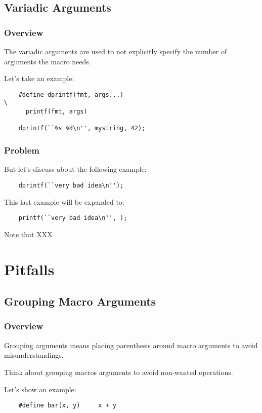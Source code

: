 \documentclass[9pt]{beamer}
\newcommand{\nl}[0]{\vspace{0.4cm}}
\begin{document}
%
%

\subsection{Variadic Arguments}


\begin{frame}[containsverbatim]
  \frametitle{Overview}

  The variadic arguments are used to not explicitly specify the number
  of arguments the macro needs.

  \nl

  Let's take an example:

  \begin{verbatim}
    #define dprintf(fmt, args...)                                       \
      printf(fmt, args)

    dprintf(``%s %d\n'', mystring, 42);
  \end{verbatim}
\end{frame}


\begin{frame}
  \frametitle{Problem}

  But let's discuss about the following example:

  \begin{verbatim}
    dprintf(``very bad idea\n'');
  \end{verbatim}

  This last example will be expanded to:

  \begin{verbatim}
    printf(``very bad idea\n'', );
  \end{verbatim}

  Note that XXX
\end{frame}

%
%

\section{Pitfalls}

%
%

\subsection{Grouping Macro Arguments}


\begin{frame}[containsverbatim]
  \frametitle{Overview}

  Grouping arguments means placing parenthesis around macro arguments
  to avoid misunderstandings.

  \nl

  Think about grouping macros arguments to avoid non-wanted operations.

  \nl

  Let's show an example:

  \begin{verbatim}
    #define bar(x, y)     x + y
  \end{verbatim}
\end{frame}
\end{document}
